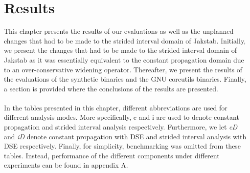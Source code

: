 \documentclass{kththesis}
\newcommand{\fbcomment}[1]{{#1}}
\renewcommand{\fbcomment}[1]{}
\renewcommand{\it}[1]{\textit{#1}}
\begin{document}
\chapter{Results}\label{chap:results}
\fbcomment{\color{red}Goal: Present the most "interesting" results of the project (Full tables will be put in an appendix).}
This chapter presents the results of our evaluations as well as the unplanned changes that had to be made to the strided interval domain of Jakstab. Initially, we present the changes that had to be made to the strided interval domain of Jakstab as it was essentially equivalent to the constant propagation domain due to an over-conservative widening operator. Thereafter, we present the results of the evaluations of the synthetic binaries and the GNU coreutils binaries. Finally, a section is provided where the conclusions of the results are presented.
\\ \\
In the tables presented in this chapter, different abbreviations are used for different analysis modes. More specifically, c and i are used to denote constant propagation and strided interval analysis respectively. Furthermore, we let \it{cD} and \it{iD} denote constant propagation with DSE and strided interval analysis with DSE respectively. Finally, for simplicity, benchmarking was omitted from these tables. Instead, performance of the different components under different experiments can be found in appendix A.

\clearpage
\end{document}
